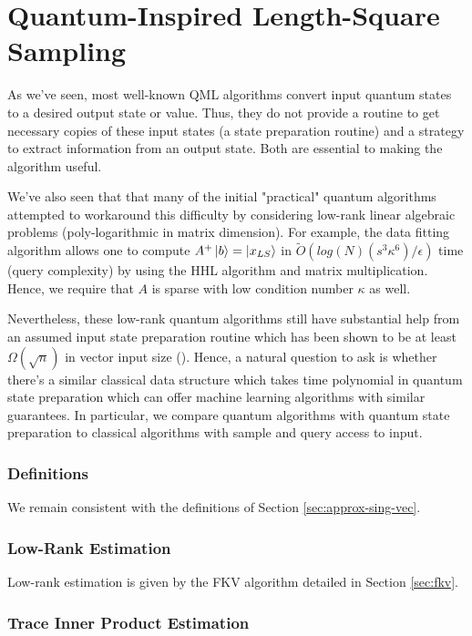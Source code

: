 \documentclass[main.tex]{subfiles}
\begin{document}
\section{Quantum-Inspired Length-Square Sampling}
\label{sec:tang}

As we've seen, most well-known QML algorithms convert input quantum states to a desired output state or value. Thus, they do not provide a routine to get necessary copies of these input states (a state preparation routine) and a strategy to extract information from an output state. Both are essential to making the algorithm useful.

We've also seen that that many of the initial "practical" quantum algorithms attempted to workaround this difficulty by considering low-rank linear algebraic problems (poly-logarithmic in matrix dimension). For example, the data fitting algorithm \cite{wiebe2012quantum} allows one to compute $A^+ \ket{b} = \ket{x_{LS}}$ in $\tilde{O}(log(N)(s^3\kappa^6)/ \epsilon)$ time (query complexity) by using the HHL algorithm and matrix multiplication. Hence, we require that $A$ is sparse with low condition number $\kappa$ as well.

Nevertheless, these low-rank quantum algorithms still have substantial help from an assumed input state preparation routine which has been shown to be at least $\Omega(\sqrt{n})$ in vector input size (\cite{tang2018quantum}). Hence, a natural question to ask is whether there's a similar classical data structure which takes time polynomial in quantum state preparation which can offer machine learning algorithms with similar guarantees. In particular, we compare quantum algorithms with quantum state preparation to classical algorithms with sample and query access to input.	

\subsubsection{Definitions}

We remain consistent with the definitions of Section \ref{sec:approx-sing-vec}.

\subsubsection{Low-Rank Estimation}

Low-rank estimation is given by the FKV algorithm detailed in Section \ref{sec:fkv}.

\subsubsection{Trace Inner Product Estimation}
\end{document}
